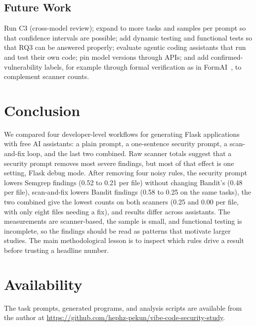\documentclass[conference]{IEEEtran}
\begin{document}
\subsection{Future Work}
Run C3 (cross-model review); expand to more tasks and samples per prompt so that confidence intervals are possible; add dynamic testing and functional tests so that RQ3 can be answered properly; evaluate agentic coding assistants that run and test their own code; pin model versions through APIs; and add confirmed-vulnerability labels, for example through formal verification as in FormAI~\cite{tihanyi2023formai}, to complement scanner counts.

\section{Conclusion}
We compared four developer-level workflows for generating Flask applications with free AI assistants: a plain prompt, a one-sentence security prompt, a scan-and-fix loop, and the last two combined. Raw scanner totals suggest that a security prompt removes most severe findings, but most of that effect is one setting, Flask debug mode. After removing four noisy rules, the security prompt lowers Semgrep findings (0.52 to 0.21 per file) without changing Bandit's (0.48 per file), scan-and-fix lowers Bandit findings (0.58 to 0.25 on the same tasks), the two combined give the lowest counts on both scanners (0.25 and 0.00 per file, with only eight files needing a fix), and results differ across assistants. The measurements are scanner-based, the sample is small, and functional testing is incomplete, so the findings should be read as patterns that motivate larger studies. The main methodological lesson is to inspect which rules drive a result before trusting a headline number.

\section*{Availability}
The task prompts, generated programs, and analysis scripts are available from the author at \url{https://github.com/hephz-pekun/vibe-code-security-study}.
\end{document}
